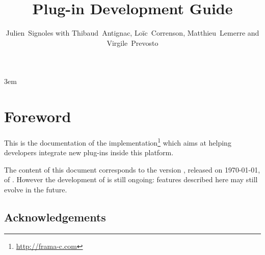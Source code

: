 \documentclass[svgnames]{frama-c-book}
\title{Plug-in Development Guide}
\author{Julien~Signoles with Thibaud~Antignac, Loïc~Correnson, Matthieu~Lemerre
and Virgile~Prevosto}
\begin{document}
\sloppy
\emergencystretch 3em


\maketitle
\tableofcontents








\chapter*{Foreword}
\markright{}

This is the documentation of the \framac
implementation\footnote{\url{http://frama-c.com}} which aims at
helping developers integrate new plug-ins inside this platform.

The content of this document corresponds to the version \framacversion,
released on \today, of \framac.
However the development of \framac is still ongoing: features
described here may still evolve in the future.

\section*{Acknowledgements}
\end{document}

